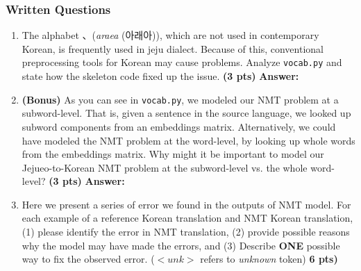 \documentclass{assignment format}
\newenvironment{answer}{
    {\bf Answer:} \begingroup\color{red}
}{\endgroup}%
\begin{document}
\subsubsection{Written Questions}
\begin{enumerate}[label=(\alph*)]
\item The alphabet 、(\textit{araea} (아래아)), which are not used in contemporary Korean, is frequently used in jeju dialect. Because of this, conventional preprocessing tools for Korean may cause problems. Analyze \texttt{vocab.py} and state how the skeleton code fixed up the issue. \textbf{(3 pts)}
\begin{answer}
\end{answer}

\item  \textbf{(Bonus)} As you can see in \texttt{vocab.py}, we modeled our NMT problem at a subword-level. That is, given a sentence in the source language, we looked up subword components from an embeddings matrix. Alternatively, we could have modeled the NMT problem at the word-level, by looking up whole words from the embeddings matrix. Why might it be important to model our Jejueo-to-Korean NMT problem at the subword-level vs. the whole word-level?  \textbf{(3 pts)}
\begin{answer}
\end{answer}

\item  Here we present a series of error we found in the outputs of NMT model. For each example of a reference Korean translation and NMT Korean translation, (1) please identify the error in NMT translation, (2) provide possible reasons why the model may have made the errors, and (3) Describe \textbf{ONE} possible way to fix the observed error. ($<unk>$ refers to \textit{unknown} token) \textbf{6 pts)}


\end{enumerate}
\end{document}
